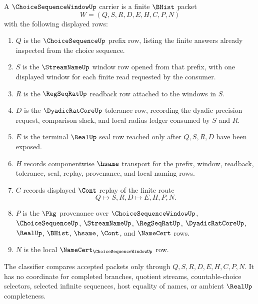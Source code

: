 \begin{definition}
\label{def:choice-sequence-window-carrier}
A $\ChoiceSequenceWindowUp$ carrier is a finite $\BHist$ packet
$$
W=(Q,S,R,D,E,H,C,P,N)
$$
with the following displayed rows:
\begin{enumerate}
\item $Q$ is the $\ChoiceSequenceUp$ prefix row, listing the finite answers already inspected from the choice sequence.
\item $S$ is the $\StreamNameUp$ window row opened from that prefix, with one displayed window for each finite read requested by the consumer.
\item $R$ is the $\RegSeqRatUp$ readback row attached to the windows in $S$.
\item $D$ is the $\DyadicRatCoreUp$ tolerance row, recording the dyadic precision request, comparison slack, and local radius ledger consumed by $S$ and $R$.
\item $E$ is the terminal $\RealUp$ seal row reached only after $Q,S,R,D$ have been exposed.
\item $H$ records componentwise $\hsame$ transport for the prefix, window, readback, tolerance, seal, replay, provenance, and local naming rows.
\item $C$ records displayed $\Cont$ replay of the finite route
$$
Q \longmapsto S,R,D \longmapsto E,H,P,N .
$$
\item $P$ is the $\Pkg$ provenance over $\ChoiceSequenceWindowUp$, $\ChoiceSequenceUp$, $\StreamNameUp$, $\RegSeqRatUp$, $\DyadicRatCoreUp$, $\RealUp$, $\BHist$, $\hsame$, $\Cont$, and $\NameCert$ rows.
\item $N$ is the local $\NameCert_{\ChoiceSequenceWindowUp}$ row.
\end{enumerate}
The classifier compares accepted packets only through $Q,S,R,D,E,H,C,P,N$. It has no coordinate for completed branches, quotient streams, countable-choice selectors, selected infinite sequences, host equality of names, or ambient $\RealUp$ completeness.
\end{definition}

